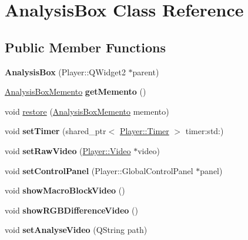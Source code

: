 \hypertarget{classAnalysisBox}{}\section{Analysis\+Box Class Reference}
\label{classAnalysisBox}
\subsection*{Public Member Functions}
\begin{DoxyCompactItemize}
\item 
\hypertarget{classAnalysisBox_ac7a6f99bbb5f35690b4a5c5bb8910df3}{}{\bfseries Analysis\+Box} (Player\+::\+Q\+Widget2 $\ast$parent)\label{classAnalysisBox_ac7a6f99bbb5f35690b4a5c5bb8910df3}

\item 
\hypertarget{classAnalysisBox_a1ee991f44c7f884808cc828b2884111c}{}\hyperlink{classAnalysisBoxMemento}{Analysis\+Box\+Memento} {\bfseries get\+Memento} ()\label{classAnalysisBox_a1ee991f44c7f884808cc828b2884111c}

\item 
void \hyperlink{classAnalysisBox_a91ed9e5c05ecd8fcc5cb5c3448ef3976}{restore} (\hyperlink{classAnalysisBoxMemento}{Analysis\+Box\+Memento} memento)
\item 
\hypertarget{classAnalysisBox_ae85e1178ac5c0f822c6311134f04b6f2}{}void {\bfseries set\+Timer} (shared\+\_\+ptr$<$ \hyperlink{classPlayer_1_1Timer}{Player\+::\+Timer} $>$ timer\+:std\+:)\label{classAnalysisBox_ae85e1178ac5c0f822c6311134f04b6f2}

\item 
\hypertarget{classAnalysisBox_a2b6f9916ed9f525eae2c47fab4275ddf}{}void {\bfseries set\+Raw\+Video} (\hyperlink{classPlayer_1_1Video}{Player\+::\+Video} $\ast$video)\label{classAnalysisBox_a2b6f9916ed9f525eae2c47fab4275ddf}

\item 
\hypertarget{classAnalysisBox_a9c1b482d1dcd6a733b84a9cdcc960263}{}void {\bfseries set\+Control\+Panel} (Player\+::\+Global\+Control\+Panel $\ast$panel)\label{classAnalysisBox_a9c1b482d1dcd6a733b84a9cdcc960263}

\item 
\hypertarget{classAnalysisBox_a9484911b10192b865138995df1158d7e}{}void {\bfseries show\+Macro\+Block\+Video} ()\label{classAnalysisBox_a9484911b10192b865138995df1158d7e}

\item 
\hypertarget{classAnalysisBox_a17b13bec505d0e1f579bdfa7f691f085}{}void {\bfseries show\+R\+G\+B\+Difference\+Video} ()\label{classAnalysisBox_a17b13bec505d0e1f579bdfa7f691f085}

\item 
\hypertarget{classAnalysisBox_af47ec5ca4337db4deb0b9eefed348e25}{}void {\bfseries set\+Analyse\+Video} (Q\+String path)\label{classAnalysisBox_af47ec5ca4337db4deb0b9eefed348e25}

\end{DoxyCompactItemize}


